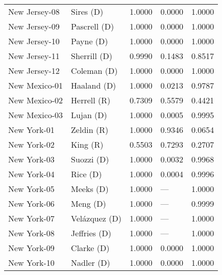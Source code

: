 \begin{longtable}{llrll}
     New Jersey-08 &           {\color{Blue} Sires (D)} &       1.0000 &        0.0000 &        1.0000 \\
     New Jersey-09 &        {\color{Blue} Pascrell (D)} &       1.0000 &        0.0000 &        1.0000 \\
     New Jersey-10 &           {\color{Blue} Payne (D)} &       1.0000 &        0.0000 &        1.0000 \\
     New Jersey-11 &        {\color{Blue} Sherrill (D)} &       0.9990 &        0.1483 &        0.8517 \\
     New Jersey-12 &         {\color{Blue} Coleman (D)} &       1.0000 &        0.0000 &        1.0000 \\
     New Mexico-01 &         {\color{Blue} Haaland (D)} &       1.0000 &        0.0213 &        0.9787 \\
     New Mexico-02 &          {\color{Red} Herrell (R)} &       0.7309 &        0.5579 &        0.4421 \\
     New Mexico-03 &           {\color{Blue} Lujan (D)} &       1.0000 &        0.0005 &        0.9995 \\
       New York-01 &           {\color{Red} Zeldin (R)} &       1.0000 &        0.9346 &        0.0654 \\
       New York-02 &             {\color{Red} King (R)} &       0.5503 &        0.7293 &        0.2707 \\
       New York-03 &          {\color{Blue} Suozzi (D)} &       1.0000 &        0.0032 &        0.9968 \\
       New York-04 &            {\color{Blue} Rice (D)} &       1.0000 &        0.0004 &        0.9996 \\
       New York-05 &           {\color{Blue} Meeks (D)} &       1.0000 &           --- &        1.0000 \\
       New York-06 &            {\color{Blue} Meng (D)} &       1.0000 &           --- &        0.9999 \\
       New York-07 &       {\color{Blue} Velázquez (D)} &       1.0000 &           --- &        1.0000 \\
       New York-08 &        {\color{Blue} Jeffries (D)} &       1.0000 &           --- &        1.0000 \\
       New York-09 &          {\color{Blue} Clarke (D)} &       1.0000 &        0.0000 &        1.0000 \\
       New York-10 &          {\color{Blue} Nadler (D)} &       1.0000 &        0.0000 &        1.0000 \\

\end{longtable}
